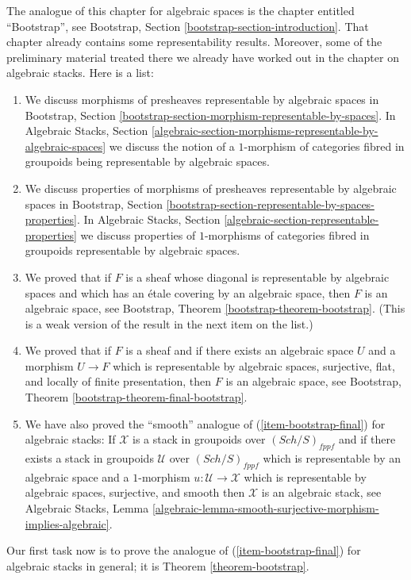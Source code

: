 \documentclass{stacks-project}
\theoremstyle{plain}
\theoremstyle{definition}
\theoremstyle{remark}
\numberwithin{equation}{subsection}
\def\Sch{\mathit{Sch}}
\begin{document}
\noindent
The analogue of this chapter for algebraic spaces is the chapter entitled
``Bootstrap'', see
Bootstrap, Section \ref{bootstrap-section-introduction}.
That chapter already contains some representability results.
Moreover, some of the preliminary material treated there we already
have worked out in the chapter on algebraic stacks.
Here is a list:
\begin{enumerate}
\item We discuss morphisms of presheaves representable by algebraic spaces in
Bootstrap, Section
\ref{bootstrap-section-morphism-representable-by-spaces}.
In
Algebraic Stacks, Section
\ref{algebraic-section-morphisms-representable-by-algebraic-spaces}
we discuss the notion of a $1$-morphism of categories fibred in groupoids
being representable by algebraic spaces.
\item We discuss properties of morphisms of presheaves representable by
algebraic spaces in
Bootstrap, Section
\ref{bootstrap-section-representable-by-spaces-properties}.
In
Algebraic Stacks, Section
\ref{algebraic-section-representable-properties}
we discuss properties of $1$-morphisms of categories fibred in groupoids
representable by algebraic spaces.
\item We proved that if $F$ is a sheaf whose diagonal is representable
by algebraic spaces and which has an \'etale covering by an algebraic
space, then $F$ is an algebraic space, see
Bootstrap, Theorem \ref{bootstrap-theorem-bootstrap}.
(This is a weak version of the result in the next item on the list.)
\item
\label{item-bootstrap-final}
We proved that if $F$ is a sheaf and if there exists an algebraic
space $U$ and a morphism $U \to F$ which is representable by algebraic
spaces, surjective, flat, and locally of finite presentation, then
$F$ is an algebraic space, see
Bootstrap, Theorem \ref{bootstrap-theorem-final-bootstrap}.
\item We have also proved the ``smooth'' analogue of
(\ref{item-bootstrap-final}) for algebraic
stacks: If $\mathcal{X}$ is a stack in groupoids over
$(\Sch/S)_{fppf}$ and if there exists a stack in groupoids
$\mathcal{U}$ over $(\Sch/S)_{fppf}$ which is representable
by an algebraic space and a $1$-morphism $u : \mathcal{U} \to \mathcal{X}$
which is representable by algebraic spaces, surjective, and smooth
then $\mathcal{X}$ is an algebraic stack, see
Algebraic Stacks, Lemma
\ref{algebraic-lemma-smooth-surjective-morphism-implies-algebraic}.
\end{enumerate}
Our first task now is to prove the analogue of
(\ref{item-bootstrap-final}) for algebraic
stacks in general; it is
Theorem \ref{theorem-bootstrap}.
\end{document}
